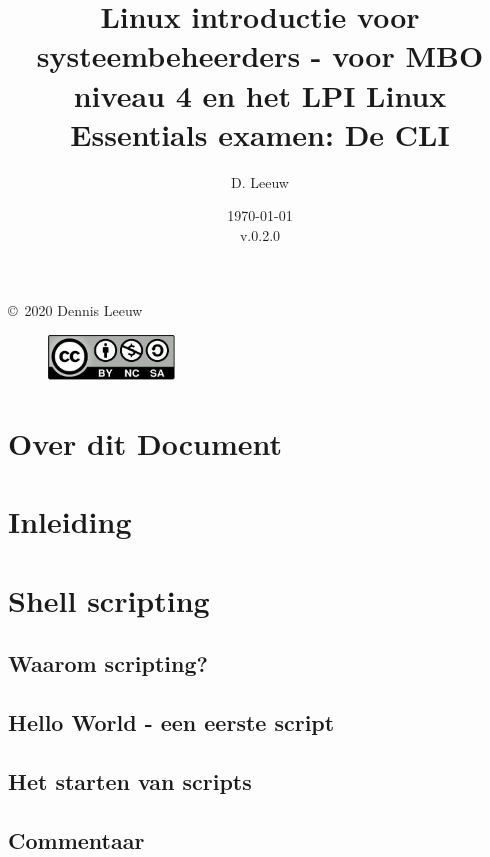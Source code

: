 \documentclass[a4paper,12pt,twoside,openright,titlepage]{book}
\author{D. Leeuw}
\title{Linux introductie voor systeembeheerders - voor MBO niveau 4 en het LPI Linux Essentials examen: De CLI}
\date{\today\\v.0.2.0}
\begin{document}

\maketitle

\copyright\ 2020 Dennis Leeuw\\

\begin{figure}
	\includegraphics[width=0.3\textwidth]{CC-BY-SA-NC.png}
\end{figure}

\bigskip




\frontmatter
\chapter{Over dit Document}


\tableofcontents

\mainmatter
\chapter{Inleiding}


\chapter{Shell scripting}

\section{Waarom scripting?}

\section{Hello World - een eerste script}

\section{Het starten van scripts}

\section{Commentaar}

\end{document}

